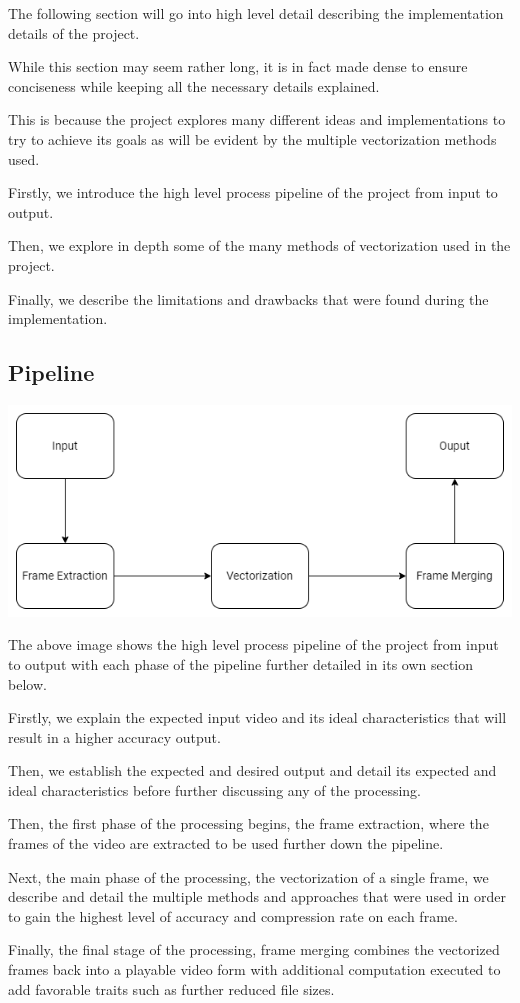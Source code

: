 \documentclass[12pt]{article}
\newcommand{\sentence}{} %
\begin{document}
    \tab
    The following section will go into high level detail describing the implementation details of the project.
    \sentence
    While this section may seem rather long, it is in fact made dense to ensure conciseness while keeping all the
    necessary details explained.
    \sentence
    This is because the project explores many different ideas and implementations to try to achieve its goals as will
    be evident by the multiple vectorization methods used.
    \sentence
    Firstly, we introduce the high level process pipeline of the project from input to output.
    \sentence
    Then, we explore in depth some of the many methods of vectorization used in the project.
    \sentence
    Finally, we describe the limitations and drawbacks that were found during the implementation.

    \subsection{Pipeline}\label{subsec:pipeline}

    \bigskip


    \includegraphics[width=\textwidth]{Pipeline.png}


    \bigskip

    The above image shows the high level process pipeline of the project from input to output with each phase of the
    pipeline further detailed in its own section below.
    \sentence
    Firstly, we explain the expected input video and its ideal characteristics that will result in a higher accuracy
    output.
    \sentence
    Then, we establish the expected and desired output and detail its expected and ideal characteristics before
    further discussing any of the processing.
    \sentence
    Then, the first phase of the processing begins, the frame extraction, where the frames of the video are
    extracted to be used further down the pipeline.
    \sentence
    Next, the main phase of the processing, the vectorization of a single frame, we describe and detail the multiple methods
    and approaches that were used in order to gain the highest level of accuracy and compression rate on each frame.
    \sentence
    Finally, the final stage of the processing, frame merging combines the vectorized frames back into a playable
    video form with additional computation executed to add favorable traits such as further reduced file sizes.
\end{document}
